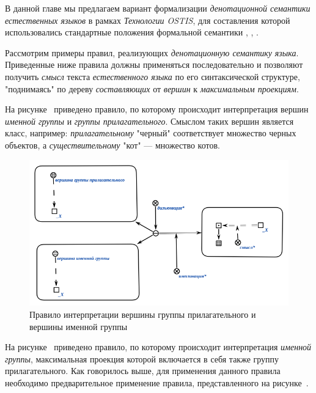 В данной главе мы предлагаем вариант формализации \textit{денотационной семантики} \textit{естественных языков} в рамках \textit{Технологии OSTIS}, для составления которой использовались стандартные положения формальной семантики , , .

Рассмотрим примеры правил, реализующих \textit{денотационную семантику} \textit{языка}.
Приведенные ниже правила должны применяться последовательно и позволяют получить \textit{смысл} текста \textit{естественного языка} по его синтаксической структуре, "поднимаясь"{} по дереву \textit{составляющих} от \textit{вершин} к \textit{максимальным проекциям}.

На рисунке~\textit{} приведено правило, по которому происходит интерпретация вершин \textit{именной группы} и \textit{группы прилагательного}.
Смыслом таких вершин является класс, например: \textit{прилагательному} "черный"{} соответствует множество черных объектов, а \textit{существительному} "кот"{} --- множество котов.

\begin{figure}[H]
    \centering
    \includegraphics[scale=0.8]{images/part2/chapter_lang/d_sem_1}
    \caption{Правило интерпретации вершины группы прилагательного и вершины именной группы}
    \label{fig:d_sem_1}
\end{figure}

На рисунке~\textit{} приведено правило, по которому происходит интерпретация \textit{именной группы}, максимальная проекция которой включается в себя также группу прилагательного.
Как говорилось выше, для применения данного правила необходимо предварительное применение правила, представленного на рисунке~\textit{}.

